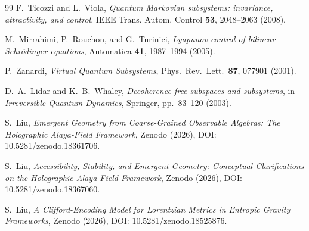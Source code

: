 \documentclass[aps,pre,onecolumn,superscriptaddress,floatfix,longbibliography]{revtex4-2}
\begin{document}
\begin{thebibliography}{99}
F.~Ticozzi and L.~Viola, \emph{Quantum Markovian subsystems: invariance, attractivity, and control}, IEEE Trans. Autom. Control \textbf{53}, 2048--2063 (2008).

M.~Mirrahimi, P.~Rouchon, and G.~Turinici, \emph{Lyapunov control of bilinear Schr\"odinger equations}, Automatica \textbf{41}, 1987--1994 (2005).

P.~Zanardi, \emph{Virtual Quantum Subsystems}, Phys.\ Rev.\ Lett.\ \textbf{87}, 077901 (2001).

D.~A.~Lidar and K.~B.~Whaley, \emph{Decoherence-free subspaces and subsystems}, in \emph{Irreversible Quantum Dynamics}, Springer, pp.\ 83--120 (2003).

S.~Liu, \emph{Emergent Geometry from Coarse-Grained Observable Algebras: The Holographic Alaya-Field Framework}, Zenodo (2026), DOI: 10.5281/zenodo.18361706.

S.~Liu, \emph{Accessibility, Stability, and Emergent Geometry: Conceptual Clarifications on the Holographic Alaya-Field Framework}, Zenodo (2026), DOI: 10.5281/zenodo.18367060.

S.~Liu, \emph{A Clifford-Encoding Model for Lorentzian Metrics in Entropic Gravity Frameworks}, Zenodo (2026), DOI: 10.5281/zenodo.18525876.

\end{thebibliography}
\end{document}
